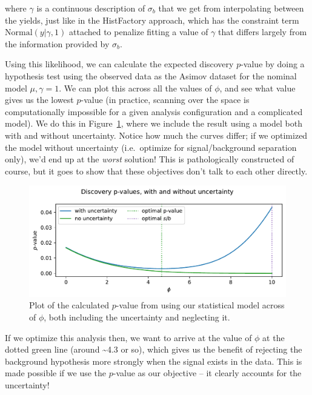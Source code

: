 \documentclass[
  11pt,
  numbers=noendperiod]{book}
\begin{document}
where \(\gamma\) is a continuous description of \(\sigma_b\) that we get
from interpolating between the yields, just like in the HistFactory
approach, which has the constraint term
\(\mathrm{Normal}(y | \gamma, 1)\) attached to penalize fitting a value
of \(\gamma\) that differs largely from the information provided by
\(\sigma_b\).

Using this likelihood, we can calculate the expected discovery
\(p\)-value by doing a hypothesis test using the observed data as the
Asimov dataset for the nominal model \(\mu, \gamma = 1\). We can plot
this across all the values of \(\phi\), and see what value gives us the
lowest \(p\)-value (in practice, scanning over the space is
computationally impossible for a given analysis configuration and a
complicated model). We do this in Figure~\ref{fig-simple-model-pval},
where we include the result using a model both with and without
uncertainty. Notice how much the curves differ; if we optimized the
model without uncertainty (i.e.~optimize for signal/background
separation only), we'd end up at the \emph{worst} solution! This is
pathologically constructed of course, but it goes to show that these
objectives don't talk to each other directly.

\begin{figure}

{\centering \includegraphics{./diffprog-hep_files/figure-pdf/fig-simple-model-pval-output-1.pdf}

}

\caption{\label{fig-simple-model-pval}Plot of the calculated \(p\)-value
from using our statistical model across of \(\phi\), both including the
uncertainty and neglecting it.}

\end{figure}

If we optimize this analysis then, we want to arrive at the value of
\(\phi\) at the dotted green line (around \textasciitilde4.3 or so),
which gives us the benefit of rejecting the background hypothesis more
strongly when the signal exists in the data. This is made possible if we
use the \(p\)-value as our objective -- it clearly accounts for the
uncertainty!
\end{document}

